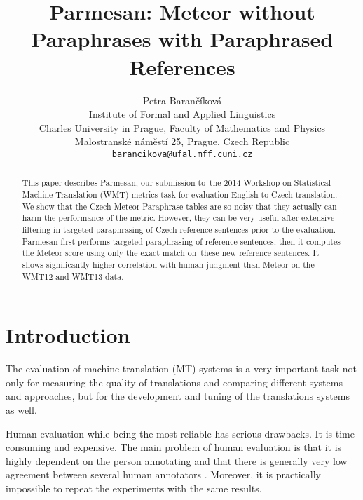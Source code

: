\documentclass[11pt]{article}
\title{Parmesan: Meteor without Paraphrases with Paraphrased References}
\author{Petra Barančíková \\
  Institute of Formal and Applied Linguistics \\
  Charles University in Prague, Faculty of Mathematics and Physics\\
  Malostranské náměstí 25, Prague, Czech Republic \\
  {\tt barancikova@ufal.mff.cuni.cz} \\}
\date{}
\begin{document}
\maketitle
\begin{abstract}
This paper describes Parmesan, our submission to~the 2014 Workshop on Statistical
Machine Translation (WMT) metrics task for evaluation English-to-Czech translation. 
We show that the Czech Meteor Paraphrase tables are so noisy that they actually can harm 
the performance of the metric. However, they can be very useful after extensive filtering 
in targeted paraphrasing of Czech reference sentences prior to the evaluation.
Parmesan first performs targeted paraphrasing of reference sentences, then it computes 
the Meteor score using only the exact match on~these new reference sentences. It shows 
significantly higher correlation with human judgment than Meteor on the WMT12 and WMT13 data. 
\end{abstract}

\section{Introduction}
The evaluation of machine translation (MT) systems is a very important task not only 
for measuring the quality of translations and comparing different systems and 
approaches, but for the development and tuning of the translations systems as well. 

Human evaluation while being the most reliable has serious drawbacks. It is time-consuming 
and expensive.%
The main problem of human evaluation is that it is highly dependent on the person annotating 
and that there is generally very low agreement between several human annotators \cite{wmt12}. 
Moreover, it is practically impossible to repeat the experiments with the same results. 
\end{document}
